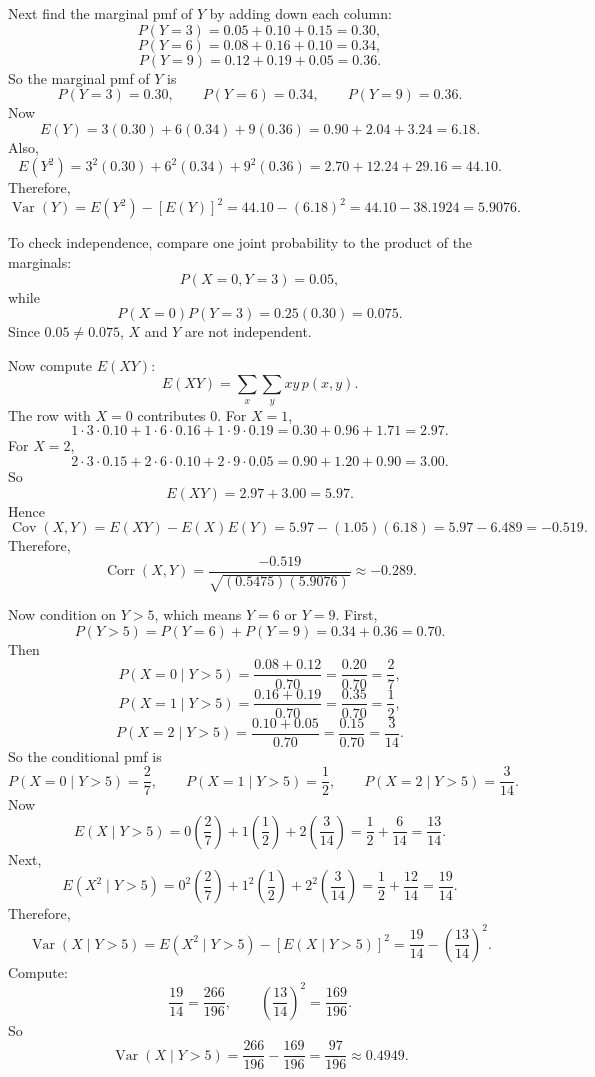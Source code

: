 \documentclass[12pt]{article}
\begin{document}
\begin{enumerate}[label=(\arabic*), leftmargin=*]
Next find the marginal pmf of $Y$ by adding down each column:
\[
P(Y=3)=0.05+0.10+0.15=0.30,
\]
\[
P(Y=6)=0.08+0.16+0.10=0.34,
\]
\[
P(Y=9)=0.12+0.19+0.05=0.36.
\]
So the marginal pmf of $Y$ is
\[
P(Y=3)=0.30,\qquad P(Y=6)=0.34,\qquad P(Y=9)=0.36.
\]
Now
\[
E(Y)=3(0.30)+6(0.34)+9(0.36)=0.90+2.04+3.24=6.18.
\]
Also,
\[
E(Y^2)=3^2(0.30)+6^2(0.34)+9^2(0.36)=2.70+12.24+29.16=44.10.
\]
Therefore,
\[
\operatorname{Var}(Y)=E(Y^2)-[E(Y)]^2=44.10-(6.18)^2=44.10-38.1924=5.9076.
\]

To check independence, compare one joint probability to the product of the marginals:
\[
P(X=0,Y=3)=0.05,
\]
while
\[
P(X=0)P(Y=3)=0.25(0.30)=0.075.
\]
Since $0.05\ne 0.075$, $X$ and $Y$ are not independent.

Now compute $E(XY)$:
\[
E(XY)=\sum_x\sum_y xy\,p(x,y).
\]
The row with $X=0$ contributes $0$. For $X=1$,
\[
1\cdot 3\cdot 0.10+1\cdot 6\cdot 0.16+1\cdot 9\cdot 0.19=0.30+0.96+1.71=2.97.
\]
For $X=2$,
\[
2\cdot 3\cdot 0.15+2\cdot 6\cdot 0.10+2\cdot 9\cdot 0.05=0.90+1.20+0.90=3.00.
\]
So
\[
E(XY)=2.97+3.00=5.97.
\]
Hence
\[
\operatorname{Cov}(X,Y)=E(XY)-E(X)E(Y)=5.97-(1.05)(6.18)=5.97-6.489=-0.519.
\]
Therefore,
\[
\operatorname{Corr}(X,Y)=\frac{-0.519}{\sqrt{(0.5475)(5.9076)}}\approx -0.289.
\]

Now condition on $Y>5$, which means $Y=6$ or $Y=9$.
First,
\[
P(Y>5)=P(Y=6)+P(Y=9)=0.34+0.36=0.70.
\]
Then
\[
P(X=0\mid Y>5)=\frac{0.08+0.12}{0.70}=\frac{0.20}{0.70}=\frac{2}{7},
\]
\[
P(X=1\mid Y>5)=\frac{0.16+0.19}{0.70}=\frac{0.35}{0.70}=\frac{1}{2},
\]
\[
P(X=2\mid Y>5)=\frac{0.10+0.05}{0.70}=\frac{0.15}{0.70}=\frac{3}{14}.
\]
So the conditional pmf is
\[
P(X=0\mid Y>5)=\frac{2}{7},\qquad P(X=1\mid Y>5)=\frac{1}{2},\qquad P(X=2\mid Y>5)=\frac{3}{14}.
\]
Now
\[
E(X\mid Y>5)=0\left(\frac{2}{7}\right)+1\left(\frac{1}{2}\right)+2\left(\frac{3}{14}\right)=\frac{1}{2}+\frac{6}{14}=\frac{13}{14}.
\]
Next,
\[
E(X^2\mid Y>5)=0^2\left(\frac{2}{7}\right)+1^2\left(\frac{1}{2}\right)+2^2\left(\frac{3}{14}\right)=\frac{1}{2}+\frac{12}{14}=\frac{19}{14}.
\]
Therefore,
\[
\operatorname{Var}(X\mid Y>5)=E(X^2\mid Y>5)-[E(X\mid Y>5)]^2
=\frac{19}{14}-\left(\frac{13}{14}\right)^2.
\]
Compute:
\[
\frac{19}{14}=\frac{266}{196},
\qquad
\left(\frac{13}{14}\right)^2=\frac{169}{196}.
\]
So
\[
\operatorname{Var}(X\mid Y>5)=\frac{266}{196}-\frac{169}{196}=\frac{97}{196}\approx 0.4949.
\]

\end{enumerate}
\end{document}
